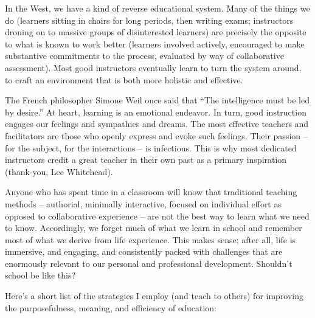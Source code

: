 \documentclass[10pt,DIV09,letterpaper,oneside,headsepline]{scrreprt}
\begin{document}
In the West, we have a kind of reverse educational system. Many of the things we do (learners sitting in chairs for long periods, then writing exams; instructors droning on to massive groups of disinterested learners) are precisely the opposite to what is known to work better (learners involved actively, encouraged to make substantive commitments to the process, evaluated by way of collaborative assessment). Most good instructors eventually learn to turn the system around, to craft an environment that is both more holistic and effective.

The French philosopher Simone Weil once said that ``The intelligence must be led by desire.'' At heart, learning is an emotional endeavor. In turn, good instruction engages our feelings and sympathies and dreams. The most effective teachers and facilitators are those who openly express and evoke such feelings. Their passion -- for the subject, for the interactions -- is infectious. This is why most dedicated instructors credit a great teacher in their own past as a primary inspiration (thank-you, Lee Whitehead).

Anyone who has spent time in a classroom will know that traditional teaching methods -- authorial, minimally interactive, focused on individual effort as opposed to collaborative experience -- are not the best way to learn what we need to know. Accordingly, we forget much of what we learn in school and remember most of what we derive from life experience. This makes sense; after all, life is immersive, and engaging, and consistently packed with challenges that are enormously relevant to our personal and professional development. Shouldn't school be like this?

Here's a short list of the strategies I employ (and teach to others) for improving the purposefulness, meaning, and efficiency of education:
\end{document}
